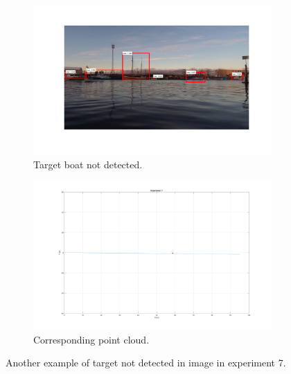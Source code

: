 \begin{figure}[H]
	\centering
	\begin{subfigure}[t]{.5\linewidth}
		\centering
		\includegraphics[width=\linewidth]{fig/ex7_miss_top.png}
		\caption{Target boat not detected.}
		\label{fig:sub_ex7_issue3}
	\end{subfigure}%
	\begin{subfigure}[t]{.5\linewidth}
		\centering
		\includegraphics[width=\linewidth]{fig/ex7_miss_top_pc.png}
		\caption{Corresponding point cloud.}
		\label{fig:sub_ex7_issue4}
	\end{subfigure}
	\caption{Another example of target not detected in image in experiment 7.}
	\label{fig:issues_ex7_2}
\end{figure}

